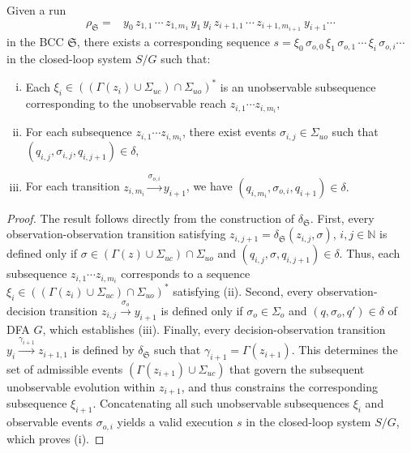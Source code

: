 \documentclass[final,5p,times,twocolumn,authoryear]{elsarticle}
\begin{document}
\begin{proposition}\label{prop:bcc_dfa_consistency}
Given a run 
$$
\begin{aligned}
\rho_{\mathfrak{S}} = &y_0 \, z_{1, 1} \, \cdots \, z_{1, m_1} \, y_1 \, y_i \, z_{i+1, 1} \, \cdots \, z_{i+1, m_{i+1}} \ y_{i+1} \cdots
\end{aligned}
$$
in the BCC $\mathfrak{S}$, there exists a corresponding sequence
$
s = \xi_0 \, \sigma_{o,0} \, \xi_1 \, \sigma_{o,1} \, \cdots \, \xi_i \, \sigma_{o,i} \cdots
$
in the closed-loop system $S/G$ such that:
\begin{enumerate}[(i)]
    \item Each $\xi_i \in ((\Gamma(z_i) \cup \Sigma_{uc}) \cap \Sigma_{uo})^*$ is an unobservable subsequence corresponding to the unobservable reach $z_{i,1} \cdots z_{i,m_{i}}$,
    \item For each subsequence $z_{i,1} \cdots z_{i,m_i}$, there exist events $\sigma_{i,j} \in \Sigma_{uo}$ such that
    $
    (q_{i,j}, \sigma_{i,j}, q_{i,j+1}) \in \delta,
    $
    \item For each transition $z_{i,m_i} \xrightarrow[]{\sigma_{o,i}} y_{i+1}$, we have
    $
    (q_{i,m_i}, \sigma_{o,i}, q_{i+1}) \in \delta.
    $
\end{enumerate}
\end{proposition}
%
\begin{proof}
The result follows directly from the construction of $\delta_{\mathfrak{S}}$.
%
First, every observation-observation transition satisfying $z_{i,j+1} = \delta_{\mathfrak{S}}(z_{i,j}, \sigma)$, $i,j \in \mathbb{N}$ is defined only if $\sigma \in (\Gamma(z) \cup \Sigma_{uc}) \cap \Sigma_{uo}$ and $(q_{i,j}, \sigma, q_{i,j+1}) \in \delta$. 
Thus, each subsequence $z_{i,1} \cdots z_{i,m_i}$ corresponds to a sequence $\xi_i \in ((\Gamma(z_i) \cup \Sigma_{uc}) \cap \Sigma_{uo})^*$ satisfying (ii).
%
Second, every observation-decision transition $z_{i,j} \xrightarrow{\sigma_o} y_{i+1}$ is defined only if $\sigma_o \in \Sigma_o$ and $(q, \sigma_o, q') \in \delta$ of DFA $G$, which establishes (iii).
%
Finally, every decision-observation transition $y_i \xrightarrow{\gamma_{i+1}} z_{i+1,1}$ is defined by $\delta_\mathfrak{S}$ such that $\gamma_{i+1} = \Gamma(z_{i+1})$.
This determines the set of admissible events $(\Gamma(z_{i+1}) \cup \Sigma_{uc})$ that govern the subsequent unobservable evolution within $z_{i+1}$, and thus constrains the corresponding subsequence $\xi_{i+1}$.
Concatenating all such unobservable subsequences $\xi_i$ and observable events $\sigma_{o,i}$ yields a valid execution $s$ in the closed-loop system $S / G$, which proves (i).
\end{proof}
\end{document}
